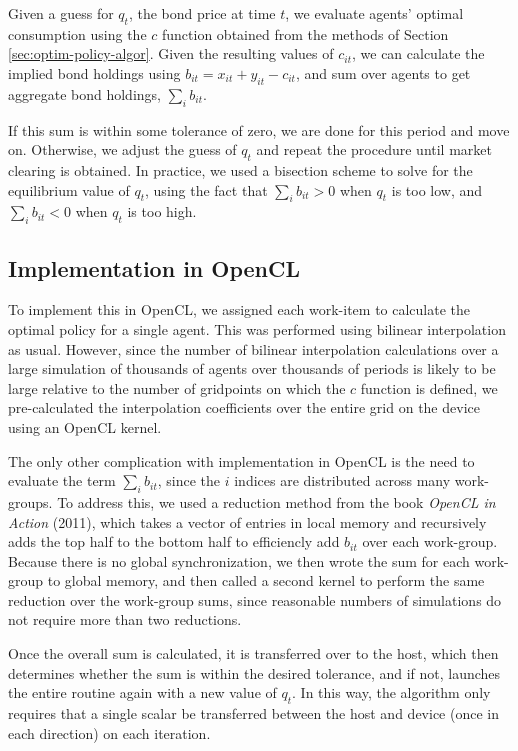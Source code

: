 \documentclass[a4paper,12pt]{article}
\numberwithin{equation}{section}
\theoremstyle{definition}
\begin{document}
Given a guess for $q_t$, the bond price at time $t$, we evaluate
agents' optimal consumption using the $c$ function obtained from the
methods of Section \ref{sec:optim-policy-algor}. Given the resulting
values of $c_{it}$, we can calculate the implied bond holdings using
$b_{it} = x_{it} + y_{it} - c_{it}$, and sum over agents to get
aggregate bond holdings, $\sum_i b_{it}$.

If this sum is within some tolerance of zero, we are done for this
period and move on. Otherwise, we adjust the guess of $q_t$ and repeat
the procedure until market clearing is obtained. In practice, we used
a bisection scheme to solve for the equilibrium value of $q_t$, using
the fact that $\sum_i b_{it} > 0$ when $q_t$ is too low, and $\sum_i
b_{it} < 0$ when $q_t$ is too high.

\subsection{Implementation in OpenCL}

To implement this in OpenCL, we assigned each work-item to calculate
the optimal policy for a single agent. This was performed using
bilinear interpolation as usual. However, since the number of bilinear
interpolation calculations over a large simulation of thousands of
agents over thousands of periods is likely to be large relative to the
number of gridpoints on which the $c$ function is defined, we
pre-calculated the interpolation coefficients over the entire grid on
the device using an OpenCL kernel.

The only other complication with implementation in OpenCL is the need
to evaluate the term $\sum_i b_{it}$, since the $i$ indices are
distributed across many work-groups. To address this, we used a
reduction method from the book \emph{OpenCL in Action} (2011), which takes a
vector of entries in local memory and recursively adds the top half to
the bottom half to efficiencly add $b_{it}$ over each
work-group. Because there is no global synchronization, we then wrote
the sum for each work-group to global memory, and then called a second
kernel to perform the same reduction over the work-group sums, since
reasonable numbers of simulations do not require more than two
reductions.

Once the overall sum is calculated, it is transferred over to the
host, which then determines whether the sum is within the desired
tolerance, and if not, launches the entire routine again with a new
value of $q_t$. In this way, the algorithm only requires that a single
scalar be transferred between the host and device (once in each
direction) on each iteration.
\end{document}
